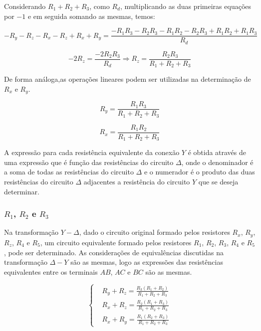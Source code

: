 \documentclass[12pt,fleqn]{book} %
\begin{document}
Considerando $R_1+R_2+R_3$, como $R_d$, multiplicando as duas primeiras equações por $-1$ e em seguida somando as mesmas, temos:

\begin{equation}
-R_y-R_z-R_x-R_z+R_x+R_y=\frac{-R_1 R_3-R_2 R_3-R_1 R_2-R_2 R_3+R_1 R_2+R_1 R_3}{R_d}
\end{equation}        

\begin{equation}
-2R_z=\frac{-2R_2 R_3}{R_d} \Rightarrow R_z=\frac{R_2 R_3}{R_1+R_2+R_3}
\end{equation}

De forma análoga,as operações lineares podem ser utilizadas na determinação de $R_x$ e $R_y$.

\begin{equation}
R_y=\frac{R_1 R_3}{R_1+R_2+R_3}
\end{equation}

\begin{equation}
 R_x=\frac{R_1 R_2}{R_1+R_2+R_3}
\end{equation}

\begin{remark}
A expressão para cada resistência equivalente da conexão $Y$ é obtida através de uma expressão que é função das resistências do circuito $\Delta$, onde o denominador é a soma de todas as resistências do circuito $\Delta$ e o numerador é o produto das duas resistências do circuito $\Delta$ adjacentes a resistência do circuito $Y$ que se deseja determinar.
\end{remark} 
 
 
        \subsubsection{$R_1$, $R_2$ e $R_3$}
        
        Na transformação $Y-\Delta$, dado o circuito original formado pelos resistores $R_x$, $R_y$, $R_z$, $R_4$ e $R_5$, um circuito equivalente formado pelos resistores $R_1$, $R_2$, $R_3$, $R_4$ e $R_5$, pode ser determinado. As considerações de equivalências discutidas na transformação $\Delta - Y$ são as mesmas, logo as expressões das resistências equivalentes entre os terminais $AB$, $AC$ e $BC$ são as mesmas.
        
 \begin{equation}
    \left\{\begin{aligned} & 
          R_y+R_z=\frac{R_3 (R_1+R_2)}{R_1+R_2+R_3}\\& 
          R_x+R_z=\frac{R_2 (R_1+R_3)}{R_1+R_2+R_3}\\&
          R_x+R_y=\frac{R_1 (R_2+R_3)}{R_1+R_2+R_3}
    \end{aligned}\right.
    \end{equation}
    
\end{document}
